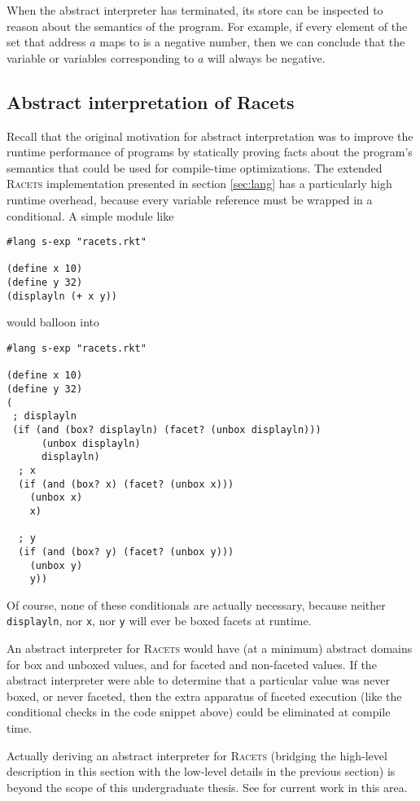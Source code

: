 \documentclass{article}
\begin{document}
When the abstract interpreter has terminated, its store can be inspected to reason about the semantics of the program. For example, if every element of the set that address $a$ maps to is a negative number, then we can conclude that the variable or variables corresponding to $a$ will always be negative.


\subsection{Abstract interpretation of Racets}
Recall that the original motivation for abstract interpretation was to improve the runtime performance of programs by statically proving facts about the program's semantics that could be used for compile-time optimizations. The extended \textsc{Racets} implementation presented in section \ref{sec:lang} has a particularly high runtime overhead, because every variable reference must be wrapped in a conditional. A simple module like

\begin{lstlisting}
#lang s-exp "racets.rkt"

(define x 10)
(define y 32)
(displayln (+ x y))
\end{lstlisting}

\noindent would balloon into

\begin{lstlisting}
#lang s-exp "racets.rkt"

(define x 10)
(define y 32)
(
 ; displayln
 (if (and (box? displayln) (facet? (unbox displayln)))
      (unbox displayln)
      displayln)
  ; x
  (if (and (box? x) (facet? (unbox x)))
    (unbox x)
    x)

  ; y
  (if (and (box? y) (facet? (unbox y)))
    (unbox y)
    y))
\end{lstlisting}

Of course, none of these conditionals are actually necessary, because neither \texttt{displayln}, nor \texttt{x}, nor \texttt{y} will ever be boxed facets at runtime.

An abstract interpreter for \textsc{Racets} would have (at a minimum) abstract domains for box and unboxed values, and for faceted and non-faceted values. If the abstract interpreter were able to determine that a particular value was never boxed, or never faceted, then the extra apparatus of faceted execution (like the conditional checks in the code snippet above) could be eliminated at compile time.

Actually deriving an abstract interpreter for \textsc{Racets} (bridging the high-level description in this section with the low-level details in the previous section) is beyond the scope of this undergraduate thesis. See \cite{abstract-inter} for current work in this area.
\end{document}
